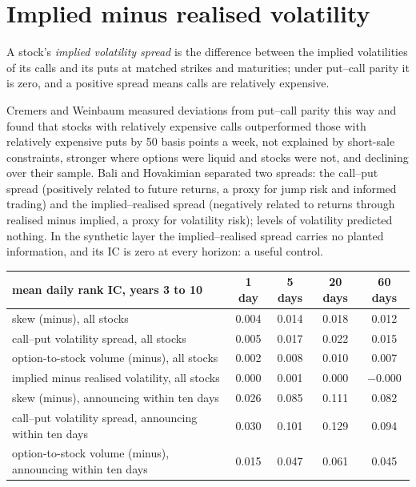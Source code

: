 \section{Implied minus realised volatility}

\begin{definition}\label{def:s1:options-implied-signals-for-stocks:spread}
A stock's \emph{implied volatility spread} is the difference between the implied volatilities of its calls and its puts at
matched strikes and maturities; under put--call parity it is zero, and a positive spread means calls are relatively expensive.
\end{definition}

Cremers and Weinbaum measured deviations from put--call parity this way and found that stocks with relatively expensive calls outperformed those with
relatively expensive puts by 50 basis points a week, not explained by short-sale constraints, stronger where options were liquid and stocks were not, and
declining over their sample. Bali and Hovakimian separated two spreads: the call--put spread (positively related to future returns, a proxy for jump
risk and informed trading) and the implied--realised spread (negatively related to returns through realised minus implied, a proxy for volatility risk);
levels of volatility predicted nothing. In the synthetic layer the implied--realised spread carries no planted information, and its IC is zero at every
horizon: a useful control.

\begin{center}
\small
\begin{tabular}{@{}lcccc@{}}
\toprule
mean daily rank IC, years 3 to 10 & 1 day & 5 days & 20 days & 60 days\\
\midrule
skew (minus), all stocks & 0.004 & 0.014 & 0.018 & 0.012\\
call--put volatility spread, all stocks & 0.005 & 0.017 & 0.022 & 0.015\\
option-to-stock volume (minus), all stocks & 0.002 & 0.008 & 0.010 & 0.007\\
implied minus realised volatility, all stocks & 0.000 & 0.001 & 0.000 & $-0.000$\\
\midrule
skew (minus), announcing within ten days & 0.026 & 0.085 & 0.111 & 0.082\\
call--put volatility spread, announcing within ten days & 0.030 & 0.101 & 0.129 & 0.094\\
option-to-stock volume (minus), announcing within ten days & 0.015 & 0.047 & 0.061 & 0.045\\
\bottomrule
\end{tabular}
\end{center}

